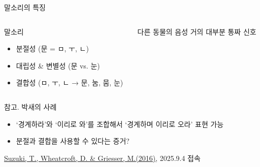 \documentclass[11pt, aspectratio=169]{beamer}
\begin{document}
\begin{frame}[t]{말소리의 특징}
    \begin{columns}
        \begin{column}[T]{0.6\textwidth}
            \begin{block}{말소리}
                \begin{itemize}
                    \item 분절성 (문 = ㅁ, ㅜ, ㄴ)
                    \item 대립성 \& 변별성 (문 vs. 눈)
                    \item 결합성 (ㅁ, ㅜ, ㄴ → 문, 눔, 뭄, 눈)
                \end{itemize}
            \end{block}            
        \end{column}
        \begin{column}[T]{0.33\textwidth}
            \begin{block}{다른 동물의 음성}
                거의 대부분 통짜 신호
            \end{block}                        
        \end{column}
    \end{columns}
    \vfill
    \begin{block}{참고. 박새의 사례}
        \begin{itemize}
            \item ‘경계하라’와 ‘이리로 와’를 조합해서 ‘경계하며 이리로 오라’ 표현 가능
            \item 분절과 결합을 사용할 수 있다는 증거?
        \end{itemize}        
    \end{block}
    \begin{flushright}
        \href{https://www.nature.com/articles/ncomms10986}{\underline{Suzuki, T., Wheatcroft, D. \& Griesser, M.(2016)}}, 2025.9.4 접속
  \end{flushright}
\end{frame}
\end{document}
